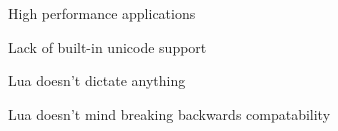 \begin{itemslide}
\item High performance applications %
\item Lack of built-in unicode support
\item Lua doesn't dictate anything
\item Lua doesn't mind breaking backwards compatability
\end{itemslide}
